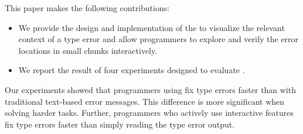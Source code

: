 This paper makes the following contributions:
\begin{itemize}
\item We provide the design and implementation of the \chameleon{} to visualize the relevant context of a type error and allow programmers to explore and verify the error locations in small chunks interactively.  
\item {
    We report the result of four experiments designed to evaluate \chameleon{}.}
\end{itemize}

Our experiments showed that programmers using \chameleon{} fix type errors faster than with traditional text-based error messages. This difference is more significant when solving harder tasks. Further, programmers who actively use \chameleon{} interactive features fix type errors faster than simply reading the type error output.
